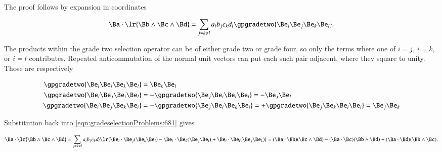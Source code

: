 %
%



The proof follows by expansion in coordinates

\begin{dmath}\label{eqn:vectorTrivectorDot:40}
\Ba \cdot \lr{ \Bb \wedge \Bc \wedge \Bd}
= \sum_{j \ne k \ne l} a_i b_j c_k d_l
\gpgradetwo{ \Be_i \Be_j \Be_k \Be_l }.
\end{dmath}

The products within the grade two selection operator can be of either grade two or grade four, so only the terms where one of
\( i = j \), \( i = k \), or \( i = l \) contributes.
Repeated anticommutation of the normal unit vectors can put each such pair adjacent, where they square to unity.
Those are respectively

\begin{dmath}\label{eqn:vectorTrivectorDot:60}
\begin{aligned}
\gpgradetwo{ \Be_i \Be_i \Be_k \Be_l } &= \Be_k \Be_l  \\
\gpgradetwo{ \Be_i \Be_j \Be_i \Be_l } &= -\gpgradetwo{ \Be_j \Be_i \Be_i \Be_l } = - \Be_j \Be_l \\
\gpgradetwo{ \Be_i \Be_j \Be_k \Be_i } &= -\gpgradetwo{ \Be_j \Be_i \Be_k \Be_i } = +\gpgradetwo{ \Be_j \Be_k \Be_i \Be_i } = \Be_j \Be_k
\end{aligned}
\end{dmath}

Substitution back into \cref{eqn:gradeselectionProblems:681} gives

\begin{dmath}\label{eqn:vectorTrivectorDot:80}
\Ba \cdot \lr{ \Bb \wedge \Bc \wedge \Bd}
= \sum_{j \ne k \ne l} a_i b_j c_k d_l
\lr{
\Be_i \cdot \Be_j (\Be_k \Be_l)
-
\Be_i \cdot \Be_k (\Be_j \Be_l)
+
\Be_i \cdot \Be_l (\Be_j \Be_k)
}
=
( \Ba \cdot \Bb ) (\Bc \wedge \Bd)
-( \Ba \cdot \Bc ) (\Bb \wedge \Bd)
+( \Ba \cdot \Bd ) (\Bb \wedge \Bc).
\end{dmath}

